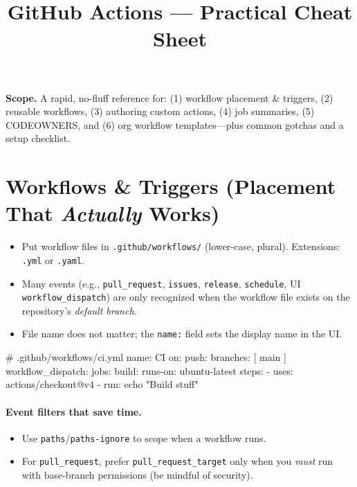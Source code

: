 \documentclass[11pt]{article}
\title{\textbf{GitHub Actions — Practical Cheat Sheet}}
\author{}
\date{}
\begin{document}
\maketitle

\begin{tcolorbox}
\textbf{Scope.} A rapid, no-fluff reference for: (1) workflow placement \& triggers, (2) reusable workflows, (3) authoring custom actions, (4) job summaries, (5) CODEOWNERS, and (6) org workflow templates—plus common gotchas and a setup checklist.
\end{tcolorbox}

\section{Workflows \& Triggers (Placement That \emph{Actually} Works)}
\begin{itemize}
  \item Put workflow files in \texttt{.github/workflows/} (lower-case, plural). Extensions: \texttt{.yml} or \texttt{.yaml}.
  \item Many events (e.g., \texttt{pull\_request}, \texttt{issues}, \texttt{release}, \texttt{schedule}, UI \texttt{workflow\_dispatch}) are only recognized when the workflow file exists on the repository's \emph{default branch}.
  \item File name does not matter; the \texttt{name:} field sets the display name in the UI.
\end{itemize}

\begin{yamlcode}
# .github/workflows/ci.yml
name: CI
on:
  push:
    branches: [ main ]
  workflow_dispatch:
jobs:
  build:
    runs-on: ubuntu-latest
    steps:
      - uses: actions/checkout@v4
      - run: echo "Build stuff"
\end{yamlcode}

\paragraph{Event filters that save time.}
\begin{itemize}
  \item Use \texttt{paths}/\texttt{paths-ignore} to scope when a workflow runs.
  \item For \texttt{pull\_request}, prefer \texttt{pull\_request\_target} only when you \emph{must} run with base-branch permissions (be mindful of security).
\end{itemize}
\clearpage
\end{document}
